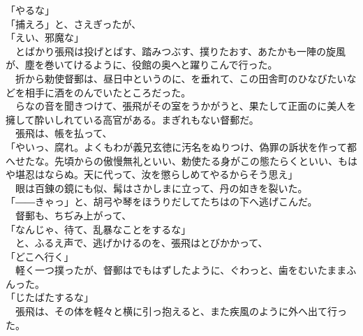 \documentclass[
  paper=a5,
  fontsize=10pt,
  jafontsize=9.5pt,
  tate,                  %
  open_bracket_pos=nibu, %
]{jlreq}
\begin{document}
「やるな」\\


「捕えろ」と、さえぎったが、\\


「えい、邪魔な」\\


　とばかり張飛は投げとばす、踏みつぶす、撲りたおす、あたかも一陣の旋風が、塵を巻いてけるように、役館の奥へと躍りこんで行った。\\


　折から勅使督郵は、昼日中というのに、を垂れて、この田舎町のひなびたいなどを相手に酒をのんでいたところだった。\\


　らなの音を聞きつけて、張飛がその室をうかがうと、果たして正面のに美人を擁して酔いしれている高官がある。まぎれもない督郵だ。\\


　張飛は、帳を払って、\\


「やいっ、腐れ。よくもわが義兄玄徳に汚名をぬりつけ、偽罪の訴状を作って都へせたな。先頃からの傲慢無礼といい、勅使たる身がこの態たらくといい、もはや堪忍はならぬ。天に代って、汝を懲らしめてやるからそう思え」\\


　眼は百錬の鏡にも似、髯はさかしまに立って、丹の如きを裂いた。\\


「――きゃっ」と、胡弓や琴をほうりだしてたちはの下へ逃げこんだ。\\


　督郵も、ちぢみ上がって、\\


「なんじゃ、待て、乱暴なことをするな」\\


　と、ふるえ声で、逃げかけるのを、張飛はとびかかって、\\


「どこへ行く」\\


　軽く一つ撲ったが、督郵はでもはずしたように、ぐわっと、歯をむいたままふんった。\\


「じたばたするな」\\


　張飛は、その体を軽々と横に引っ抱えると、また疾風のように外へ出て行った。\\
\end{document}
